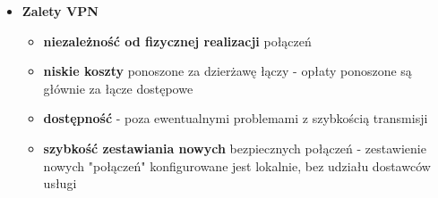 \documentclass[main.tex]{subfiles}
\begin{document}
\begin{itemize}[noitemsep]
        \item \textbf{Zalety VPN}
        \begin{itemize}[noitemsep]
            \item \textbf{niezależność od fizycznej realizacji} połączeń
            \item \textbf{niskie koszty} ponoszone za dzierżawę łączy - opłaty ponoszone są głównie za łącze dostępowe
            \item \textbf{dostępność} - poza ewentualnymi problemami z szybkością transmisji
            \item \textbf{szybkość zestawiania nowych} bezpiecznych połączeń - zestawienie nowych "połączeń"
            konfigurowane jest lokalnie, bez udziału dostawców usługi
        \end{itemize}
    \end{itemize}
    \hfill \\
\end{document}
